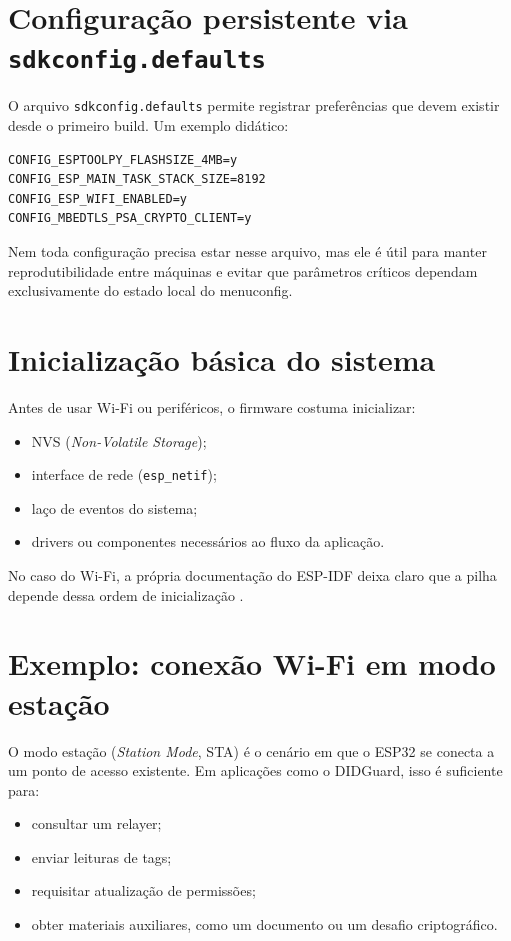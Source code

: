 \section{Configuração persistente via \texttt{sdkconfig.defaults}}
O arquivo \texttt{sdkconfig.defaults} permite registrar preferências que devem existir desde o primeiro build. Um exemplo didático:
\begin{verbatim}
CONFIG_ESPTOOLPY_FLASHSIZE_4MB=y
CONFIG_ESP_MAIN_TASK_STACK_SIZE=8192
CONFIG_ESP_WIFI_ENABLED=y
CONFIG_MBEDTLS_PSA_CRYPTO_CLIENT=y
\end{verbatim}

Nem toda configuração precisa estar nesse arquivo, mas ele é útil para manter reprodutibilidade entre máquinas e evitar que parâmetros críticos dependam exclusivamente do estado local do menuconfig.

\section{Inicialização básica do sistema}
Antes de usar Wi-Fi ou periféricos, o firmware costuma inicializar:
\begin{itemize}[leftmargin=*]
  \item NVS (\textit{Non-Volatile Storage});
  \item interface de rede (\texttt{esp\_netif});
  \item laço de eventos do sistema;
  \item drivers ou componentes necessários ao fluxo da aplicação.
\end{itemize}

No caso do Wi-Fi, a própria documentação do ESP-IDF deixa claro que a pilha depende dessa ordem de inicialização \citep{espidf_wifi,espidf_nvs}.

\section{Exemplo: conexão Wi-Fi em modo estação}
O modo estação (\textit{Station Mode}, STA) é o cenário em que o ESP32 se conecta a um ponto de acesso existente. Em aplicações como o DIDGuard, isso é suficiente para:
\begin{itemize}[leftmargin=*]
  \item consultar um relayer;
  \item enviar leituras de tags;
  \item requisitar atualização de permissões;
  \item obter materiais auxiliares, como um documento ou um desafio criptográfico.
\end{itemize}


